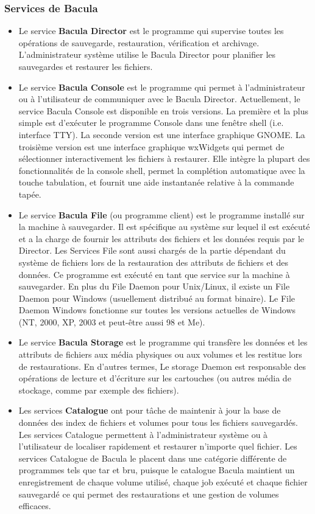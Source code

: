 \documentclass[a4paper,11pt]{report}
\begin{document}
\subsubsection{Services de Bacula}
\begin{itemize}
  \item Le service \textbf{Bacula Director} est le programme qui supervise toutes les opérations de sauvegarde, restauration, vérification et archivage. L'administrateur système utilise le Bacula Director pour planifier les sauvegardes et restaurer les fichiers.
  \item Le service \textbf{Bacula Console} est le programme qui permet à l'administrateur ou à l'utilisateur de communiquer avec le Bacula Director. Actuellement, le service Bacula Console est disponible en trois versions. La première et la plus simple est d'exécuter le programme Console dans une fenêtre shell (i.e. interface TTY). La seconde version est une interface graphique GNOME. La troisième version est une interface graphique wxWidgets qui permet de sélectionner interactivement les fichiers à restaurer. Elle intègre la plupart des fonctionnalités de la console shell, permet la complétion automatique avec la touche tabulation, et fournit une aide instantanée relative à la commande tapée.
  \item Le service \textbf{Bacula File} (ou programme client) est le programme installé sur la machine à sauvegarder. Il est spécifique au système sur lequel il est exécuté et a la charge de fournir les attributs des fichiers et les données requis par le Director. Les Services File sont aussi chargés de la partie dépendant du système de fichiers lors de la restauration des attributs de fichiers et des données. Ce programme est exécuté en tant que service sur la machine à sauvegarder. En plus du File Daemon pour Unix/Linux, il existe un File Daemon pour Windows (usuellement distribué au format binaire). Le File Daemon Windows fonctionne sur toutes les versions actuelles de Windows (NT, 2000, XP, 2003 et peut-être aussi 98 et Me).
  \item Le service \textbf{Bacula Storage} est le programme qui transfère les données et les attributs de fichiers aux média physiques ou aux volumes et les restitue lors de restaurations. En d'autres termes, Le storage Daemon est responsable des opérations de lecture et d'écriture sur les cartouches (ou autres média de stockage, comme par exemple des fichiers).
  \item Les services \textbf{Catalogue} ont pour tâche de maintenir à jour la base de données des index de fichiers et volumes pour tous les fichiers sauvegardés. Les services Catalogue permettent à l'administrateur système ou à l'utilisateur de localiser rapidement et restaurer n'importe quel fichier. Les services Catalogue de Bacula le placent dans une catégorie différente de programmes tels que tar et bru, puisque le catalogue Bacula maintient un enregistrement de chaque volume utilisé, chaque job exécuté et chaque fichier sauvegardé ce qui permet des restaurations et une gestion de volumes efficaces.
\end{itemize}
\end{document}
